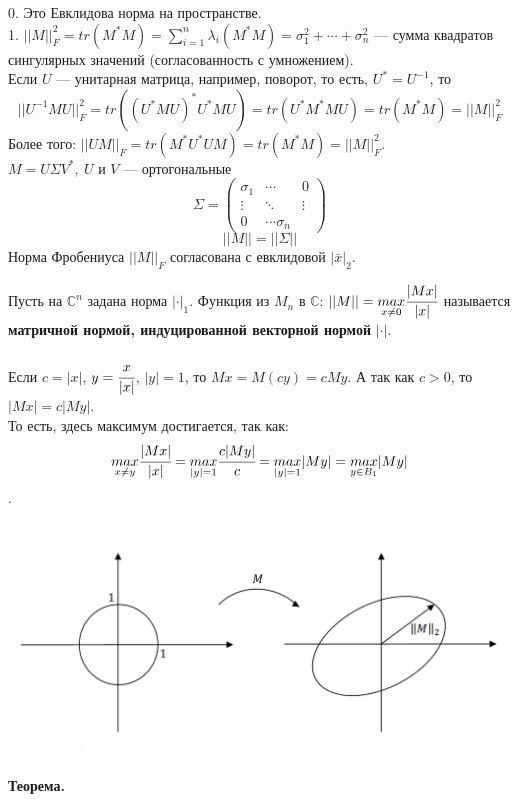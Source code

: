 \documentclass[12pt]{article}
\theoremstyle{definition}
\numberwithin{equation}{section}
\begin{document}
\begin{itemize}
0. Это Евклидова норма на пространстве.\\
1. $||M||_F^2=tr(M^*M)=\sum\limits_{i=1}^n\lambda_i(M^*M)=\sigma_1^2+\cdots+\sigma_n^2$ --- сумма квадратов сингулярных значений (согласованность с умножением).\\
Если $U$ --- унитарная матрица, например, поворот, то есть, $U^*=U^{-1}$, то $$||U^{-1}MU||_F^2=tr((U^*MU)^*U^*MU)=tr(U^*M^*MU)=tr(M^*M)=||M||_F^2$$
Более того: $||UM||_F=tr(M^*U^*UM)=tr(M^*M)=||M||_F^2$.\\
$M=U\Sigma V^*,~U$ и $V$ --- ортогональные\\
\[\Sigma = \begin{pmatrix}
\sigma_1 & \cdots & 0\\
\vdots & \ddots & \vdots\\
0 & \cdots \sigma_n
\end{pmatrix}\]
$$||M||=||\Sigma||$$
Норма Фробениуса $||M||_F$ согласована с евклидовой $|\bar x|_2$.
\end{itemize}
Пусть на $\mathbb{C}^n$ задана норма $|\cdot |_1$. Функция из $M_n$ в $\mathbb{C}$: $||M||=\underset{x\neq 0}{max} \cfrac{|Mx|}{|x|}$ называется \textbf{матричной нормой, индуцированной векторной нормой} $|\cdot|$.\\ \\
Если $c=|x|$, $y=\cfrac{x}{|x|}$, $|y|=1$, то $Mx=M(cy)=cMy.$ А так как $c>0$, то $|Mx|=c|My|$.\\
То есть, здесь максимум достигается, так как: $$\underset{x\neq y}{max}\cfrac{|Mx|}{|x|}=\underset{|y|=1}{max}\cfrac{c|My|}{c}=\underset{|y|=1}{max}|My|=\underset{y\in B_1}{max}|My|$$.\begin{center}
\includegraphics[scale=0.6]{l7_1.png}\end{center}
\textbf{Теорема.}\\
\end{document}
